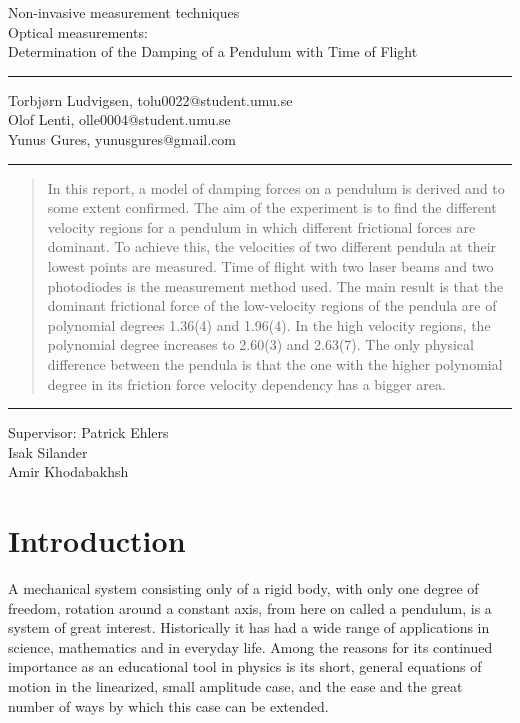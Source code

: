 \documentclass[11pt, a4paper]{article}
\date{\todayswe}
\makeatletter
\def\contacts{Torbjørn Ludvigsen, tolu0022@student.umu.se\\Olof Lenti, olle0004@student.umu.se\\
Yunus Gures, yunusgures@gmail.com}
\def\course{Non-invasive measurement techniques}
\def\lab{Optical measurements:\\Determination of the Damping of a Pendulum with Time of Flight}
\def\supervisors{Patrick Ehlers\\Isak Silander\\ Amir Khodabakhsh}
\makeatother
\begin{document}
\pagestyle{fancy}
\begin{titlepage}
	\begin{center}
		\course\\
		\Large{\lab}\vspace{2mm}
		\hrule\vspace{2mm}
		\tiny{\contacts}\vspace{2mm}
		\hrule
	\end{center}
	\vspace{4mm}

	\begin{abstract}

		\noindent In this report, a model of damping forces on a pendulum is derived and to some extent confirmed.
		The aim of the experiment is to find the different velocity regions for a pendulum in which different frictional forces are dominant.
		To achieve this, the velocities of two different pendula at their lowest points are measured.
		Time of flight with two laser beams and two photodiodes is the measurement method used.
		The main result is that the dominant frictional force of the  low-velocity regions of the pendula are of polynomial degrees 1.36(4) and 1.96(4).
		In the high velocity regions, the polynomial degree increases to 2.60(3) and 2.63(7).
		The only physical difference between the pendula is that the one with the higher polynomial degree in its friction force velocity dependency has a bigger area.

	\end{abstract}
	\vfill
	\hrule\vspace{2mm}
	\centering
		\tiny{Supervisor: \supervisors}
\end{titlepage}

\pagestyle{plain}
\vspace{2cm}
\section{Introduction}
A mechanical system consisting only of a rigid body, with only one degree of 
freedom, rotation around a constant axis, from here on called a pendulum, is 
a system of great interest. Historically it has had a wide range of
applications in science, mathematics and in everyday life. Among the reasons for
its continued importance as an educational tool in physics is its short, general 
equations of
motion in the linearized, small amplitude case, and the ease and the great number 
of ways by which this case can be extended.
\end{document}
